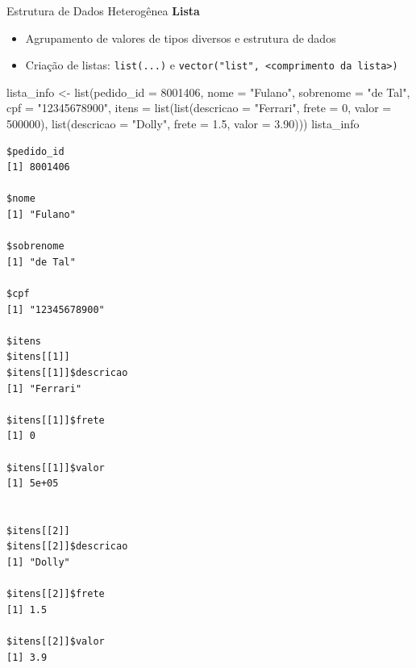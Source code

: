 \documentclass[
  10pt,
  ignorenonframetext,
]{beamer}
\newenvironment{Shaded}{\begin{snugshade}}{\end{snugshade}}
\newcommand{\AttributeTok}[1]{\textcolor[rgb]{0.40,0.45,0.13}{#1}}
\newcommand{\DecValTok}[1]{\textcolor[rgb]{0.68,0.00,0.00}{#1}}
\newcommand{\FloatTok}[1]{\textcolor[rgb]{0.68,0.00,0.00}{#1}}
\newcommand{\FunctionTok}[1]{\textcolor[rgb]{0.28,0.35,0.67}{#1}}
\newcommand{\NormalTok}[1]{\textcolor[rgb]{0.00,0.23,0.31}{#1}}
\newcommand{\OtherTok}[1]{\textcolor[rgb]{0.00,0.23,0.31}{#1}}
\newcommand{\StringTok}[1]{\textcolor[rgb]{0.13,0.47,0.30}{#1}}
\providecommand{\tightlist}{%
  \setlength{\itemsep}{0pt}\setlength{\parskip}{0pt}}\usepackage{longtable,booktabs,array}
\begin{document}
\begin{frame}[fragile]{Estrutura de Dados Heterogênea}
\protect\hypertarget{estrutura-de-dados-heteroguxeanea}{}
\textbf{Lista}

\begin{itemize}
\tightlist
\item
  Agrupamento de valores de tipos diversos e estrutura de dados
\item
  Criação de listas: \texttt{list(...)} e
  \texttt{vector("list",\ \textless{}comprimento\ da\ lista\textgreater{})}
\end{itemize}

\begin{Shaded}
\begin{Highlighting}[]
\NormalTok{lista\_info }\OtherTok{\textless{}{-}} \FunctionTok{list}\NormalTok{(}\AttributeTok{pedido\_id =} \DecValTok{8001406}\NormalTok{,}
          \AttributeTok{nome =} \StringTok{"Fulano"}\NormalTok{,}
          \AttributeTok{sobrenome =} \StringTok{"de Tal"}\NormalTok{,}
          \AttributeTok{cpf =} \StringTok{"12345678900"}\NormalTok{,}
          \AttributeTok{itens =} \FunctionTok{list}\NormalTok{(}\FunctionTok{list}\NormalTok{(}\AttributeTok{descricao =} \StringTok{"Ferrari"}\NormalTok{,}
                            \AttributeTok{frete =} \DecValTok{0}\NormalTok{,}
                            \AttributeTok{valor =} \DecValTok{500000}\NormalTok{),}
                        \FunctionTok{list}\NormalTok{(}\AttributeTok{descricao =} \StringTok{"Dolly"}\NormalTok{, }\AttributeTok{frete =} \FloatTok{1.5}\NormalTok{,}
                              \AttributeTok{valor =} \FloatTok{3.90}\NormalTok{)))}
\NormalTok{lista\_info}
\end{Highlighting}
\end{Shaded}
\end{frame}

\begin{frame}[fragile]
\scriptsize

\begin{verbatim}
$pedido_id
[1] 8001406

$nome
[1] "Fulano"

$sobrenome
[1] "de Tal"

$cpf
[1] "12345678900"

$itens
$itens[[1]]
$itens[[1]]$descricao
[1] "Ferrari"

$itens[[1]]$frete
[1] 0

$itens[[1]]$valor
[1] 5e+05


$itens[[2]]
$itens[[2]]$descricao
[1] "Dolly"

$itens[[2]]$frete
[1] 1.5

$itens[[2]]$valor
[1] 3.9
\end{verbatim}

\normalsize
\end{frame}
\end{document}

